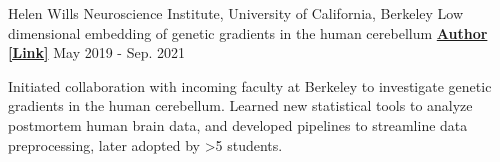 \begin{cventries}
  \cventry
    {Helen Wills Neuroscience Institute, University of California, Berkeley} %
    {Low dimensional embedding of genetic gradients in the human cerebellum} %
    {\href{https://papers.ssrn.com/sol3/papers.cfm?abstract_id=3797269}{\textbf{Author [Link]}}}
    {May 2019 - Sep. 2021}
    {
      \begin{cvitems} %
      	\item {Initiated collaboration with incoming faculty at Berkeley to investigate genetic gradients in the human cerebellum. Learned new statistical tools to analyze postmortem human brain data, and developed pipelines to streamline data preprocessing, later adopted by >5 students.}
      \end{cvitems}
    }
  
\end{cventries}



